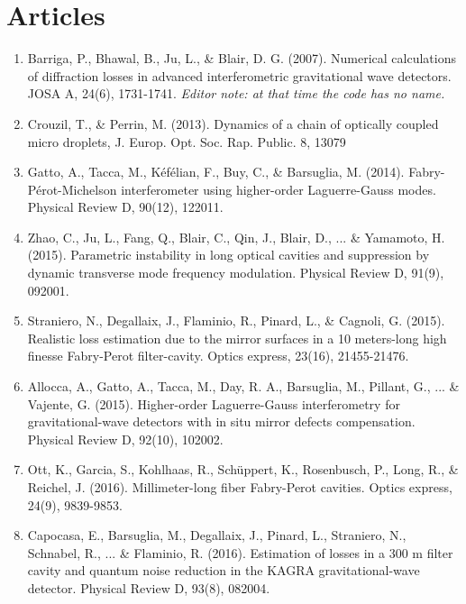 \section{Articles}

\begin{enumerate}

\item Barriga, P., Bhawal, B., Ju, L., \& Blair, D. G. (2007). Numerical calculations of diffraction losses in advanced interferometric gravitational wave detectors. JOSA A, 24(6), 1731-1741. \emph{Editor note: at that time the code has no name.}

\item Crouzil, T., \& Perrin, M. (2013). Dynamics of a chain of optically coupled micro droplets, J. Europ. Opt. Soc. Rap. Public. 8, 13079

\item Gatto, A., Tacca, M., Kéfélian, F., Buy, C., \& Barsuglia, M. (2014). Fabry-Pérot-Michelson interferometer using higher-order Laguerre-Gauss modes. Physical Review D, 90(12), 122011.

\item Zhao, C., Ju, L., Fang, Q., Blair, C., Qin, J., Blair, D., ... \& Yamamoto, H. (2015). Parametric instability in long optical cavities and suppression by dynamic transverse mode frequency modulation. Physical Review D, 91(9), 092001.

\item Straniero, N., Degallaix, J., Flaminio, R., Pinard, L., \& Cagnoli, G. (2015). Realistic loss estimation due to the mirror surfaces in a 10 meters-long high finesse Fabry-Perot filter-cavity. Optics express, 23(16), 21455-21476.

\item Allocca, A., Gatto, A., Tacca, M., Day, R. A., Barsuglia, M., Pillant, G., ... \& Vajente, G. (2015). Higher-order Laguerre-Gauss interferometry for gravitational-wave detectors with in situ mirror defects compensation. Physical Review D, 92(10), 102002.

\item Ott, K., Garcia, S., Kohlhaas, R., Schüppert, K., Rosenbusch, P., Long, R., \& Reichel, J. (2016). Millimeter-long fiber Fabry-Perot cavities. Optics express, 24(9), 9839-9853.

\item Capocasa, E., Barsuglia, M., Degallaix, J., Pinard, L., Straniero, N., Schnabel, R., ... \& Flaminio, R. (2016). Estimation of losses in a 300 m filter cavity and quantum noise reduction in the KAGRA gravitational-wave detector. Physical Review D, 93(8), 082004.


\end{enumerate}
